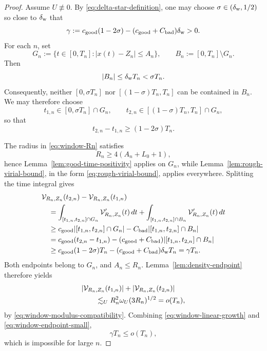 \documentclass[preprint,12pt]{elsarticle}
\numberwithin{equation}{section}
\theoremstyle{remark}
\newcommand{\dd}{\,d}
\newcommand{\Vcal}{\mathcal V}
\begin{document}
\begin{proof}
Assume $U\not\equiv0$. By \eqref{eq:delta-star-definition}, one may choose $\sigma\in(\delta_{\rm w},1/2)$ so close to $\delta_{\rm w}$ that
\begin{equation*}
  \gamma
  :=c_{\rm good}(1-2\sigma)
  -(c_{\rm good}+C_{\rm bad})\delta_{\rm w}>0.
\end{equation*}
For each $n$, set
\begin{equation*}
  G_n:=\{t\in[0,T_n]:|x(t)-Z_n|\le A_n\},
  \qquad
  B_n:=[0,T_n]\setminus G_n.
\end{equation*}
Then
\begin{equation*}
  |B_n|\le\delta_{\rm w}T_n<\sigma T_n.
\end{equation*}
Consequently, neither $[0,\sigma T_n]$ nor $[(1-\sigma)T_n,T_n]$ can be contained in $B_n$.  We may therefore choose
\begin{equation*}
  t_{1,n}\in[0,\sigma T_n]\cap G_n,
  \qquad
  t_{2,n}\in[(1-\sigma)T_n,T_n]\cap G_n,
\end{equation*}
so that
\begin{equation*}
  t_{2,n}-t_{1,n}\ge(1-2\sigma)T_n.
\end{equation*}

The radius in \eqref{eq:window-Rn} satisfies
\[
  R_n\ge4(A_n+L_0+1),
\]
hence Lemma~\ref{lem:good-time-positivity} applies on $G_n$, while Lemma~\ref{lem:rough-virial-bound}, in the form \eqref{eq:rough-virial-bound}, applies everywhere.  Splitting the time integral gives
\begin{align}
 &\Vcal_{R_n,Z_n}(t_{2,n})
  -\Vcal_{R_n,Z_n}(t_{1,n})\notag\\
 &\quad=\int_{[t_{1,n},t_{2,n}]\cap G_n}
  \Vcal_{R_n,Z_n}'(t)\dd t
  +\int_{[t_{1,n},t_{2,n}]\cap B_n}
  \Vcal_{R_n,Z_n}'(t)\dd t\notag\\
 &\quad\ge
  c_{\rm good}
  |[t_{1,n},t_{2,n}]\cap G_n|
  -C_{\rm bad}
  |[t_{1,n},t_{2,n}]\cap B_n|\notag\\
 &\quad=
  c_{\rm good}(t_{2,n}-t_{1,n})
  -(c_{\rm good}+C_{\rm bad})
  |[t_{1,n},t_{2,n}]\cap B_n|\notag\\
 &\quad\ge
  c_{\rm good}(1-2\sigma)T_n
  -(c_{\rm good}+C_{\rm bad})\delta_{\rm w}T_n
  =\gamma T_n.
  \label{eq:window-linear-growth}
\end{align}
Both endpoints belong to $G_n$, and $A_n\le R_n$.  Lemma~\ref{lem:density-endpoint} therefore yields
\begin{align}
 &|\Vcal_{R_n,Z_n}(t_{1,n})|
  +|\Vcal_{R_n,Z_n}(t_{2,n})|\notag\\
 &\qquad\lesssim_U R_n^2\omega_U(3R_n)^{1/2}
  =o(T_n),
  \label{eq:window-endpoint-small}
\end{align}
by \eqref{eq:window-modulus-compatibility}.  Combining \eqref{eq:window-linear-growth} and \eqref{eq:window-endpoint-small},
\[
  \gamma T_n
  \le o(T_n),
\]
which is impossible for large $n$.
\end{proof}
\end{document}

